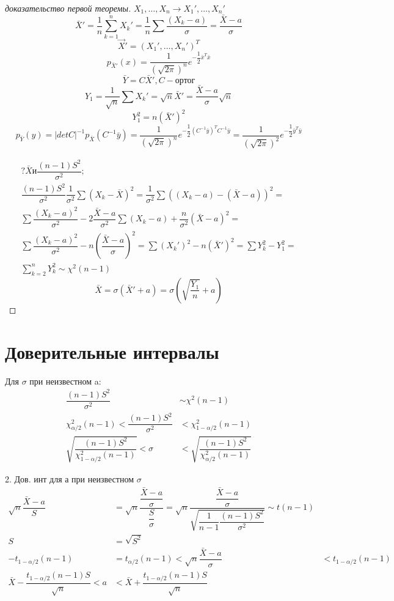 \begin{proof}[доказательство первой теоремы]
  $X_1, \dots, X_n \rightarrow X_1', \dots, X_n'$
  $$\bar X' = \dfrac{1}{n} \sum\limits_{k=1}^n X_k' = \dfrac{1}{n} \sum \dfrac{(X_k - a)}{\sigma} = \dfrac{\bar X - a}{\sigma}$$
  $$\vec{X}' = (X_1', \dots, X_n')^T$$
  $$p_{\bar X'} (x) = \dfrac{1}{(\sqrt{2\pi})^n} e^{-\dfrac{1}{2} \bar x^T \bar x}$$
  $$\bar Y = C \bar X', C - \text{ортог}$$
  $$Y_1 = \dfrac{1}{\sqrt{n}} \sum X_k' = \sqrt{n} \bar X' = \dfrac{\bar X - a}{\sigma} \sqrt{n}$$
  $$Y_1^2 = n (\bar X')^2$$
  $$p_{\bar Y} (y) = |det C|^{-1} p_{\bar X} (C^{-1} \bar y) = \dfrac{1}{(\sqrt{2\pi})^n} e^{-\dfrac{1}{2} (C^{-1} \bar y)^T C^{-1} \bar y} = \dfrac{1}{(\sqrt{2\pi})^2} e^{-\dfrac{1}{2} \bar y^T \bar y}$$
  
  \begin{multline*}
    ? \bar X и \dfrac{(n-1) S^2}{\sigma^2}; \\
    \dfrac{(n-1) S^2}{\sigma^2} \dfrac{1}{\sigma^2} \sum (X_k-\bar X)^2 = \dfrac{1}{\sigma^2} \sum ((X_k - a) - (\bar X - a))^2 =\\
    \sum \dfrac{(X_k-a)^2}{\sigma^2}-2 \dfrac{\bar X - a}{\sigma^2} \sum (X_k-a) + \dfrac{n}{\sigma^2} (\bar X - a)^2 = \\
    \sum \dfrac{(X_k-a)^2}{\sigma^2} - n \left(\dfrac{\bar X-a}{\sigma}\right)^2  = \sum (X_k')^2 - n (\bar X')^2 = \sum Y_k^2 - Y_1^2 = \\ 
    \sum\limits_{k=2}^n Y_k^2 \sim \chi^2(n-1)
  \end{multline*}
  $$\bar X = \sigma (\bar X' + a) = \sigma \left(\sqrt{\dfrac{Y_1}{n}} + a\right)$$
\end{proof}

\section{Доверительные интервалы}

Для $\sigma$ при неизвестном a:
\begin{align*}
  \dfrac{(n-1) S^2}{ \sigma^2 } &\sim \chi^2(n-1) \\
  \chi^2_{\alpha/2} (n-1) < \dfrac{(n-1) S^2}{\sigma^2}& < \chi^2_{1 - \alpha/2} (n-1) \\
  \sqrt{\dfrac{(n-1) S^2}{\chi^2_{1 - \alpha/2}(n-1)}} < \sigma& < \sqrt{\dfrac{(n-1) S^2}{\chi^2_{\alpha/2} (n-1)}}
\end{align*}

2. Дов. инт для а при неизвестном $\sigma$
\begin{align*}
  \sqrt{n} \dfrac{\bar X - a}{S} &= \sqrt{n} \dfrac{\dfrac{\bar X - a}{\sigma}}{\dfrac{S}{\sigma}} = \sqrt{n} \dfrac{\dfrac{\bar X - a}{\sigma}}{\sqrt{\dfrac{1}{n-1} \dfrac{(n-1) S^2}{\sigma^2}}} \sim t(n-1) \\
  S &= \sqrt{S^2} \\
  -t_{1 - \alpha/2} (n-1) &= t_{\alpha/2} (n-1) < \sqrt{n} \dfrac{\bar X - a}{\sigma}& < t_{1-\alpha/2} (n-1) \\
  \bar X - \dfrac{t_{1-\alpha/2}(n-1) S}{\sqrt{n}} < a& < \bar X + \dfrac{t_{1-\alpha/2}(n-1) S}{\sqrt{n}}
\end{align*}

